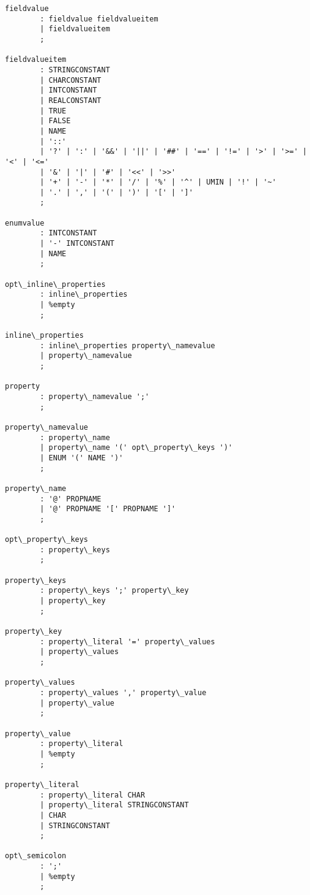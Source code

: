 \begin{Verbatim}[commandchars=\\\{\}]
fieldvalue
        : fieldvalue fieldvalueitem
        | fieldvalueitem
        ;

fieldvalueitem
        : STRINGCONSTANT
        | CHARCONSTANT
        | INTCONSTANT
        | REALCONSTANT
        | TRUE
        | FALSE
        | NAME
        | '::'
        | '?' | ':' | '&&' | '||' | '##' | '==' | '!=' | '>' | '>=' | '<' | '<='
        | '&' | '|' | '#' | '<<' | '>>'
        | '+' | '-' | '*' | '/' | '%' | '^' | UMIN | '!' | '~'
        | '.' | ',' | '(' | ')' | '[' | ']'
        ;

enumvalue
        : INTCONSTANT
        | '-' INTCONSTANT
        | NAME
        ;

opt\_inline\_properties
        : inline\_properties
        | %empty
        ;

inline\_properties
        : inline\_properties property\_namevalue
        | property\_namevalue
        ;

property
        : property\_namevalue ';'
        ;

property\_namevalue
        : property\_name
        | property\_name '(' opt\_property\_keys ')'
        | ENUM '(' NAME ')'
        ;

property\_name
        : '@' PROPNAME
        | '@' PROPNAME '[' PROPNAME ']'
        ;

opt\_property\_keys
        : property\_keys
        ;

property\_keys
        : property\_keys ';' property\_key
        | property\_key
        ;

property\_key
        : property\_literal '=' property\_values
        | property\_values
        ;

property\_values
        : property\_values ',' property\_value
        | property\_value
        ;

property\_value
        : property\_literal
        | %empty
        ;

property\_literal
        : property\_literal CHAR
        | property\_literal STRINGCONSTANT
        | CHAR
        | STRINGCONSTANT
        ;

opt\_semicolon
        : ';'
        | %empty
        ;
\end{Verbatim}


